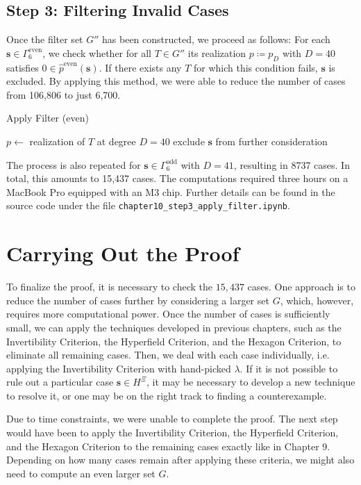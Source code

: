 \subsection*{Step 3: Filtering Invalid Cases}

Once the filter set \( G'' \) has been constructed, we proceed as follows: For each \( \mathbf{s} \in \Gamma^{\mathrm{even}}_6 \), we check whether for all \( T \in G'' \) its realization \( p \coloneqq p_D \) with \( D = 40 \) satisfies \( 0 \in \hat p^{\mathrm{even}}(\mathbf{s}) \). If there exists any \( T \) for which this condition fails, \( \mathbf{s} \) is excluded. By applying this method, we were able to reduce the number of cases from 106,806 to just 6,700. 
\begin{algorithm}[H]
    \caption{Apply Filter (even)}
    \label{alg:filter}
    \begin{algorithmic}[1]
        \State \( p \gets \) realization of \( T \) at degree \( D = 40 \)
            \State exclude \( \mathbf{s} \) from further consideration
        \EndIf        
        \EndFor       
    \EndFor
\EndFunction
\end{algorithmic}
\end{algorithm}
The process is also repeated for \( \mathbf{s} \in \Gamma^{\mathrm{odd}}_6 \) with \( D = 41 \), resulting in 8737 cases. 
In total, this amounts to 15,437 cases. 
The computations required three hours on a MacBook Pro equipped with an M3 chip. Further details can be found in the source code \cite{ducrepo} under the file \texttt{chapter10\_step3\_apply\_filter.ipynb}.


\section{Carrying Out the Proof}

To finalize the proof, it is necessary to check the \( 15,437 \) cases. 
One approach is to reduce the number of cases further by considering a larger set \( G \), 
which, however, requires more computational power. 
Once the number of cases is sufficiently small, we can apply the techniques developed in previous chapters, 
such as the Invertibility Criterion, the Hyperfield Criterion, and the Hexagon Criterion, to eliminate all remaining cases. Then, we deal with each case individually, i.e. applying the Invertibility Criterion with hand-picked \( \lambda \).
If it is not possible to rule out a particular case \( \mathbf{s} \in H^{\Xi} \), 
it may be necessary to develop a new technique to resolve it, or one may be on the right track to finding a counterexample.

Due to time constraints, we were unable to complete the proof. 
The next step would have been to apply the Invertibility Criterion, the Hyperfield Criterion, 
and the Hexagon Criterion to the remaining cases exactly like in Chapter 9.
Depending on how many cases remain after applying these criteria, 
we might also need to compute an even larger set \( G \). 